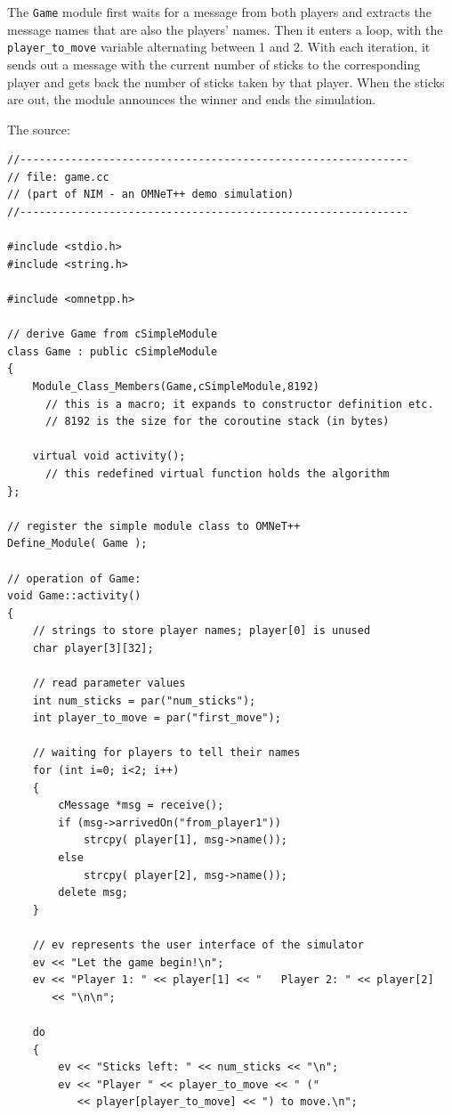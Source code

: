 The \texttt{Game} module first waits for a message from both players
and extracts the message names that are also the players' names.  Then
it enters a loop, with the \texttt{player\_to\_move} variable
alternating between 1 and 2. With each iteration, it sends out a
message with the current number of sticks to the corresponding player
and gets back the number of sticks taken by that player. When the
sticks are out, the module announces the winner and ends the
simulation.

The source:


\begin{verbatim}
//-------------------------------------------------------------
// file: game.cc
// (part of NIM - an OMNeT++ demo simulation)
//-------------------------------------------------------------

#include <stdio.h>
#include <string.h>

#include <omnetpp.h>

// derive Game from cSimpleModule
class Game : public cSimpleModule
{
    Module_Class_Members(Game,cSimpleModule,8192)
      // this is a macro; it expands to constructor definition etc.
      // 8192 is the size for the coroutine stack (in bytes)

    virtual void activity();
      // this redefined virtual function holds the algorithm
};

// register the simple module class to OMNeT++
Define_Module( Game );

// operation of Game:
void Game::activity()
{
    // strings to store player names; player[0] is unused
    char player[3][32];

    // read parameter values
    int num_sticks = par("num_sticks");
    int player_to_move = par("first_move");

    // waiting for players to tell their names
    for (int i=0; i<2; i++)
    {
        cMessage *msg = receive();
        if (msg->arrivedOn("from_player1"))
            strcpy( player[1], msg->name());
        else
            strcpy( player[2], msg->name());
        delete msg;
    }

    // ev represents the user interface of the simulator
    ev << "Let the game begin!\n";
    ev << "Player 1: " << player[1] << "   Player 2: " << player[2]
       << "\n\n";

    do
    {
        ev << "Sticks left: " << num_sticks << "\n";
        ev << "Player " << player_to_move << " ("
           << player[player_to_move] << ") to move.\n";


\end{verbatim}
